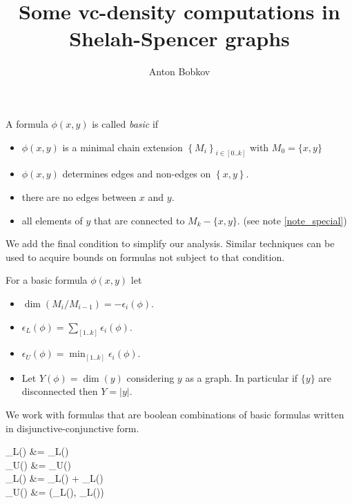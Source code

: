 \documentclass{amsart}
\title{Some vc-density computations in Shelah-Spencer graphs}
\author{Anton Bobkov}
\newcommand{\curly}[1]{\left\{#1\right\}}
\newcommand{\paren}[1]{\left(#1\right)}
\begin{document}
\maketitle

\begin{Definition}
	A formula $\phi(x, y)$ is called \emph{basic} if
	\begin{itemize}
		\item $\phi(x, y)$ is a minimal chain extension $\curly{M_i}_{i \in [0..k]}$ with $M_0 = \{x, y\}$
		\item $\phi(x, y)$ determines edges and non-edges on $\curly{x, y}$.
		\item there are no edges between $x$ and $y$.
		\item all elements of $y$ that are connected to $M_k - \{x,y\}$. (see note \ref{note_special})
	\end{itemize}
\end{Definition}


\begin{Note} \label{note_special}
	We add the final condition to simplify our analysis. Similar techniques can be used to acquire bounds on formulas not subject to that condition.
\end{Note}

\begin{Definition}
	For a basic formula $\phi(x, y)$ let
	\begin{itemize}
		\item $\dim \paren{M_i/M_{i-1}} = -\epsilon_i(\phi)$.
		\item $\epsilon_L(\phi) = \sum_{[1..k]} \epsilon_i(\phi)$.
		\item $\epsilon_U(\phi) = \min_{[1..k]} \epsilon_i(\phi)$.
		\item Let $Y(\phi) = \dim (y)$ considering $y$ as a graph.
		In particular if $\{y\}$ are disconnected then $Y = |y|$.
	\end{itemize}
\end{Definition}

We work with formulas that are boolean combinations of basic formulas written in disjunctive-conjunctive form.

\begin{Definition}
	\epsilon_L(\neg \phi) &= \epsilon_L(\phi) \\
	\epsilon_U(\neg \phi) &= \epsilon_U(\phi) \\
	\epsilon_L(\phi \wedge \psi) &= \epsilon_L(\phi) + \epsilon_L(\psi) \\
	\epsilon_U(\phi \wedge \psi) &= \min(\epsilon_L(\phi), \epsilon_L(\psi)) \\
\end{Definition}
\end{document}
